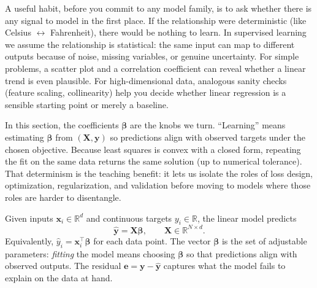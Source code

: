 \noindent A useful habit, before you commit to any model family, is to ask whether there is any signal to model in the first place. If the relationship were deterministic (like Celsius \(\leftrightarrow\) Fahrenheit), there would be nothing to learn. In supervised learning we assume the relationship is statistical: the same input can map to different outputs because of noise, missing variables, or genuine uncertainty. For simple problems, a scatter plot and a correlation coefficient can reveal whether a linear trend is even plausible. For high-dimensional data, analogous sanity checks (feature scaling, collinearity) help you decide whether linear regression is a sensible starting point or merely a baseline.

\noindent In this section, the coefficients \(\boldsymbol{\beta}\) are the knobs we turn. ``Learning'' means estimating \(\boldsymbol{\beta}\) from \((\mathbf{X},\mathbf{y})\) so predictions align with observed targets under the chosen objective. Because least squares is convex with a closed form, repeating the fit on the same data returns the same solution (up to numerical tolerance). That determinism is the teaching benefit: it lets us isolate the roles of loss design, optimization, regularization, and validation before moving to models where those roles are harder to disentangle.

Given inputs \(\mathbf{x}_i\in\mathbb{R}^d\) and continuous targets \(y_i\in\mathbb{R}\), the linear model predicts
\begin{equation}
    \hat{\mathbf{y}} = \mathbf{X}\boldsymbol{\beta}, \qquad \mathbf{X}\in\mathbb{R}^{N\times d}.
    \label{eq:linear_model}
\end{equation}
Equivalently, \(\hat{y}_i = \mathbf{x}_i^\top \boldsymbol{\beta}\) for each data point. The vector \(\boldsymbol{\beta}\) is the set of adjustable parameters: \emph{fitting} the model means choosing \(\boldsymbol{\beta}\) so that predictions align with observed outputs. The residual \(\mathbf{e}=\mathbf{y}-\hat{\mathbf{y}}\) captures what the model fails to explain on the data at hand.

